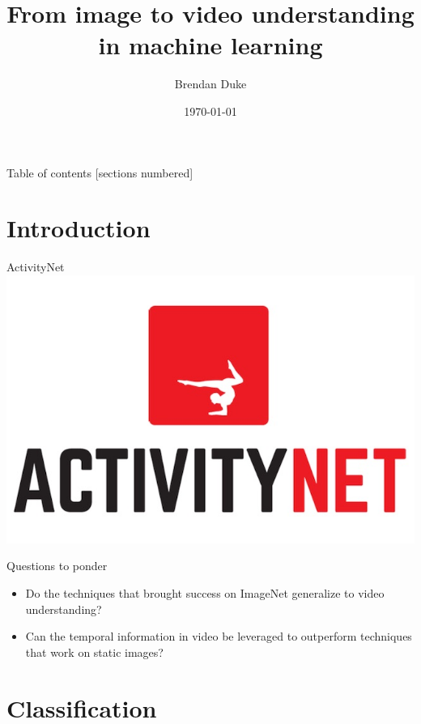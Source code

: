 \documentclass{beamer}
\title{From image to video understanding in machine learning}
\date{\today}
\author{Brendan Duke}
\institute{University of Guelph}
\begin{document}
\maketitle

\begin{frame}{Table of contents}
  [sections numbered]
  \tableofcontents[hideallsubsections]
\end{frame}

\section{Introduction}

\begin{frame}{ActivityNet}
        \center
        \includegraphics[scale=1.0]{data/activity-net.png}
\end{frame}

\begin{frame}[fragile]{Questions to ponder}
        \begin{itemize}[<+- | alert@+>]
                \item Do the techniques that brought success on ImageNet
                        generalize to video understanding?

                \item Can the temporal information in video be leveraged to
                        outperform techniques that work on static images?
        \end{itemize}
\end{frame}

\section{Classification}
\end{document}
